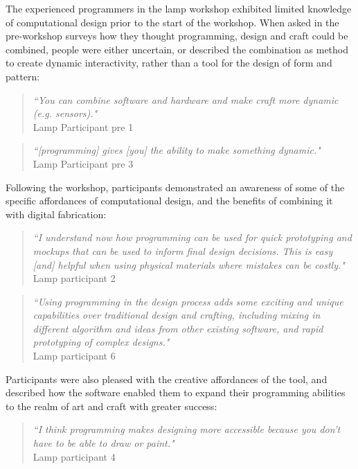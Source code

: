 The experienced programmers in the lamp workshop exhibited limited knowledge of computational design prior to the start of the workshop. When asked in the pre-workshop surveys how they thought programming, design and craft could be combined, people were either uncertain, or described the combination as method to create dynamic interactivity, rather than a tool for the design of form and pattern:
\begin{quotation}
\textit{``You can combine software and hardware and make craft more dynamic (e.g. sensors)."}
 \\Lamp Participant pre 1
\end{quotation}
\begin{quotation}
\textit{``[programming] gives [you] the ability to make something dynamic."}
 \\Lamp Participant pre 3
\end{quotation}

Following the workshop, participants demonstrated an awareness of some of the specific affordances of computational design, and the benefits of combining it with digital fabrication:
\begin{quotation}
\textit{``I understand now how programming can be used for quick prototyping and mockups that can be used to inform final design decisions. This is easy [and] helpful when using physical materials where mistakes can be costly."}
\\Lamp participant 2
\end{quotation}

\begin{quotation}
\textit{``Using programming in the design process adds some exciting and unique capabilities over traditional design and crafting, including mixing in different algorithm and ideas from other existing software, and rapid prototyping of complex designs."}
\\Lamp participant 6
\end{quotation} 

Participants were also pleased with the creative affordances of the tool, and described how the software enabled them to expand their programming abilities to the realm of art and craft with greater success: 
\begin{quotation}
\textit{``I think programming makes designing more accessible because you don't have to be able to draw or paint."}
\\Lamp participant 4
\end{quotation}

